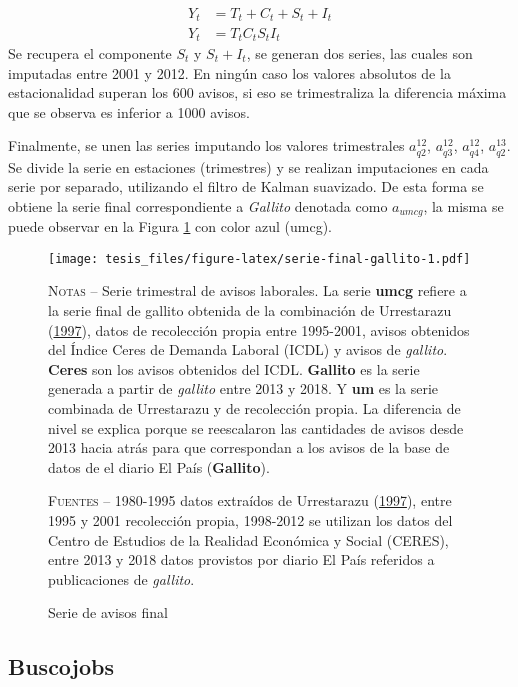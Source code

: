 \documentclass[12pt,oneside]{reedthesis}
\makeatletter
\def\maxwidth{ %
  \ifdim\Gin@nat@width>\linewidth
    \linewidth
  \else
    \Gin@nat@width
  \fi
}
\makeatother
\begin{document}
\[
\begin{aligned}
Y_t &= T_t + C_t + S_t + I_t \\
Y_t &= T_t C_t S_t I_t
\end{aligned}
\]
Se recupera el componente \(S_t\) y \(S_t + I_t\), se generan dos series, las cuales son imputadas entre 2001 y 2012. En ningún caso los valores absolutos de la estacionalidad superan los 600 avisos, si eso se trimestraliza la diferencia máxima que se observa es inferior a 1000 avisos.

Finalmente, se unen las series imputando los valores trimestrales \(a_{q2}^{12}\), \(a_{q3}^{12}\), \(a_{q4}^{12}\), \(a_{q2}^{13}\). Se divide la serie en estaciones (trimestres) y se realizan imputaciones en cada serie por separado, utilizando el filtro de Kalman suavizado. De esta forma se obtiene la serie final correspondiente a \emph{Gallito} denotada como \(a_{umcg}\), la misma se puede observar en la Figura \ref{fig:serie-final-gallito} con color azul (umcg).
\begin{figure}
\texttt{[image: tesis\_files/figure-latex/serie-final-gallito-1.pdf]}
\caption{Serie de avisos final}\label{fig:serie-final-gallito}\textsc{}

\footnotesize\textsc{Notas} -- Serie trimestral de avisos laborales. La serie \textbf{umcg} refiere a la serie final de gallito obtenida de la combinación de Urrestarazu (\protect\hyperlink{ref-Urrestarazu1997}{1997}), datos de recolección propia entre 1995-2001, avisos obtenidos del Índice Ceres de Demanda Laboral (ICDL) y avisos de \textit{gallito}. \textbf{Ceres} son los avisos obtenidos del ICDL. \textbf{Gallito} es la serie generada a partir de \textit{gallito} entre 2013 y 2018. Y \textbf{um} es la serie combinada de Urrestarazu y de recolección propia. La diferencia de nivel se explica porque se reescalaron las cantidades de avisos desde 2013 hacia atrás para que correspondan a los avisos de la base de datos de el diario El País (\textbf{Gallito}).

\textsc{Fuentes} -- 1980-1995 datos extraídos de Urrestarazu (\protect\hyperlink{ref-Urrestarazu1997}{1997}), entre 1995 y 2001 recolección propia, 1998-2012 se utilizan los datos del Centro de Estudios de la Realidad Económica y Social (CERES), entre 2013 y 2018 datos provistos por diario El País referidos a publicaciones de \textit{gallito}.
\end{figure}
\hypertarget{buscojobs}{%
\subsection{Buscojobs}\label{buscojobs}}
\end{document}
